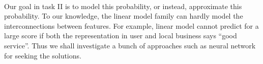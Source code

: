 \documentclass{article}
\begin{document}
\paragraph{} Our goal in task II is to model this probability, or instead, approximate this probability. To our knowledge, the linear model family can hardly model the interconnections between features. For example, linear model cannot predict for a large score if both the representation in user and local business says “good service”. Thus we shall investigate a bunch of approaches such as neural network for seeking the solutions.



\end{document}
